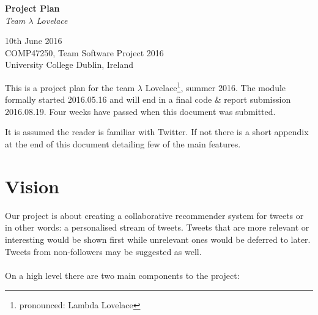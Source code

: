 \documentclass{article}
\begin{document}
\begin{center}
	{\LARGE \textbf{Project Plan}} \\
	\vspace{0.5em}
	\textsl{Team $\lambda$ Lovelace}
\end{center}

\vspace{0.5em}

\begin{center}
	10th June 2016 \\
	COMP47250, Team Software Project 2016 \\ 
	University College Dublin, Ireland \\
\end{center}

\vspace{0.5em}



\noindent This is a project plan for the team $\lambda$ Lovelace\footnote{pronounced: Lambda Lovelace}, summer 2016. The module formally started 2016.05.16 and will end in a final code \& report submission 2016.08.19. Four weeks have passed when this document was submitted.

It is assumed the reader is familiar with Twitter. If not there is a short appendix at the end of this document detailing few of the main features.


\section{Vision}
% 

Our project is about creating a collaborative recommender system for tweets or in other words: a personalised stream of tweets. Tweets that are more relevant or interesting would be shown first while unrelevant ones would be deferred to later. Tweets from non-followers may be suggested as well.
\\\\
On a high level there are two main components to the project:
\end{document}
